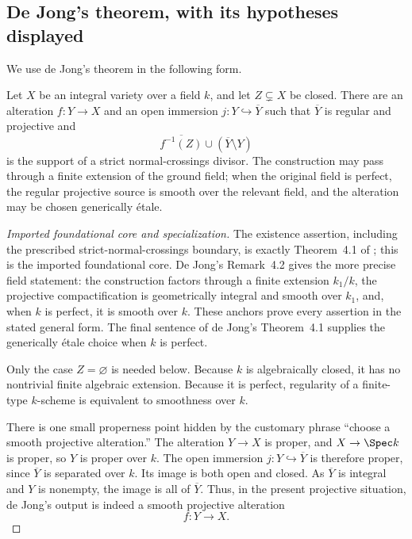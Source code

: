\subsection{De Jong's theorem, with its hypotheses displayed}
\label{sec:ch42-de-jong}

We use de Jong's theorem in the following form.

\begin{theorem}\label{thm:bj-de-jong-input}
Let $X$ be an integral variety over a field $k$, and let
$Z\subsetneq X$ be closed.
There are an alteration $f:Y\to X$ and an open immersion
$j:Y\hookrightarrow\overline Y$ such that $\overline Y$ is regular and
projective and
\[
       \overline{f^{-1}(Z)}\cup(\overline Y\setminus Y)
\]
is the support of a strict normal-crossings divisor.
The construction may pass through a finite extension of the ground field;
when the original field is perfect, the regular projective source is smooth
over the relevant field, and the alteration may be chosen generically
étale.
\end{theorem}

\begin{proof}[Imported foundational core and specialization]
The existence assertion, including the prescribed strict-normal-crossings
boundary, is exactly Theorem~4.1 of \cite{deJong1996}; this is the imported
foundational core.  De Jong's Remark~4.2 gives the more precise field
statement: the construction factors through a finite extension
$k_1/k$, the projective compactification is geometrically integral and
smooth over $k_1$, and, when $k$ is perfect, it is smooth over $k$.
These anchors prove every assertion in the stated general form.
The final sentence of de Jong's Theorem~4.1 supplies the generically étale
choice when $k$ is perfect.

Only the case $Z=\varnothing$ is needed below.
Because $k$ is algebraically closed, it has no nontrivial finite algebraic
extension.
Because it is perfect, regularity of a finite-type $k$-scheme is equivalent
to smoothness over $k$.

There is one small properness point hidden by the customary phrase
``choose a smooth projective alteration.''
The alteration $Y\to X$ is proper, and $X\to\Spec k$ is proper, so $Y$
is proper over $k$.
The open immersion $j:Y\hookrightarrow\overline Y$ is therefore proper,
since $\overline Y$ is separated over $k$.
Its image is both open and closed.
As $\overline Y$ is integral and $Y$ is nonempty, the image is all of
$\overline Y$.
Thus, in the present projective situation, de Jong's output is indeed a
smooth projective alteration
\[
                         f:Y\longrightarrow X.
\tag{42.2}\label{eq:bj-smooth-projective-alteration}
\]
\end{proof}

